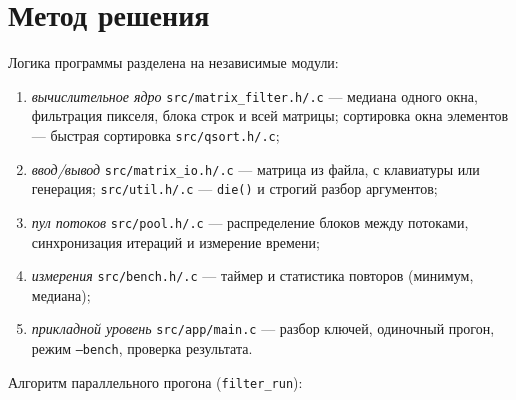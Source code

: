 \section{Метод решения}

Логика программы разделена на независимые модули:
\begin{enumerate}
  \item \emph{вычислительное ядро} \texttt{src/matrix\_filter.h/.c} --- медиана одного окна,
    фильтрация пикселя, блока строк и всей матрицы; сортировка окна элементов --- быстрая
    сортировка \texttt{src/qsort.h/.c};
  \item \emph{ввод/вывод} \texttt{src/matrix\_io.h/.c} --- матрица из файла, с клавиатуры или
    генерация; \texttt{src/util.h/.c} --- \texttt{die()} и строгий разбор аргументов;
  \item \emph{пул потоков} \texttt{src/pool.h/.c} --- распределение блоков между потоками,
    синхронизация итераций и измерение времени;
  \item \emph{измерения} \texttt{src/bench.h/.c} --- таймер и статистика повторов
    (минимум, медиана);
  \item \emph{прикладной уровень} \texttt{src/app/main.c} --- разбор ключей, одиночный прогон,
    режим \texttt{--bench}, проверка результата.
\end{enumerate}

Алгоритм параллельного прогона (\texttt{filter\_run}):

